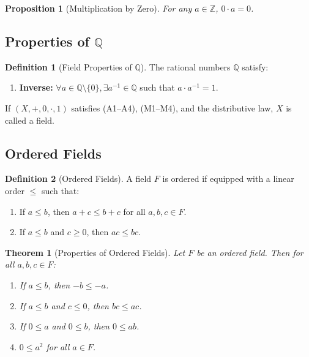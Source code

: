 \documentclass[9pt]{article}
\theoremstyle{definition}
\newtheorem{definition}{Definition}
\theoremstyle{plain}
\newtheorem{theorem}{Theorem}
\newtheorem{proposition}{Proposition}
\begin{document}
\begin{proposition}[Multiplication by Zero]
For any \( a \in \mathbb{Z} \), \( 0 \cdot a = 0 \).
\end{proposition}

\subsection*{Properties of \( \mathbb{Q} \)}
\begin{definition}[Field Properties of \( \mathbb{Q} \)]
The rational numbers \( \mathbb{Q} \) satisfy:
\begin{enumerate}[label=(M\arabic*), resume]
    \item \textbf{Inverse:} \( \forall a \in \mathbb{Q} \setminus \{0\}, \exists a^{-1} \in \mathbb{Q} \) such that \( a \cdot a^{-1} = 1 \).
\end{enumerate}
If \( (X, +, 0, \cdot, 1) \) satisfies (A1–A4), (M1–M4), and the distributive law, \( X \) is called a field.
\end{definition}

\subsection*{Ordered Fields}
\begin{definition}[Ordered Fields]
A field \( F \) is ordered if equipped with a linear order \( \leq \) such that:
\begin{enumerate}[label=(O\arabic*)]
    \item If \( a \leq b \), then \( a + c \leq b + c \) for all \( a, b, c \in F \).
    \item If \( a \leq b \) and \( c \geq 0 \), then \( ac \leq bc \).
\end{enumerate}
\end{definition}

\begin{theorem}[Properties of Ordered Fields]
Let \( F \) be an ordered field. Then for all \( a, b, c \in F \):
\begin{enumerate}[label=(\roman*)]
    \item If \( a \leq b \), then \( -b \leq -a \).
    \item If \( a \leq b \) and \( c \leq 0 \), then \( bc \leq ac \).
    \item If \( 0 \leq a \) and \( 0 \leq b \), then \( 0 \leq ab \).
    \item \( 0 \leq a^2 \) for all \( a \in F \).
\end{enumerate}
\end{theorem}
\end{document}
